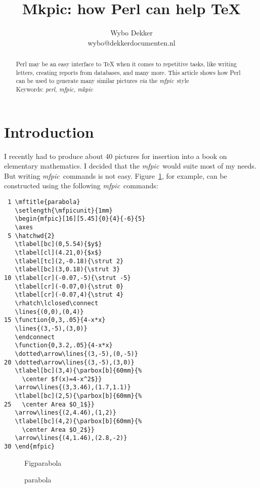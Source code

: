\documentclass[a4paper,twocolumn]{article}
\def\Mfpic{\textsl{mfpic}}
\newcommand{\makefigure}[1]{
  \vspace{2ex}
  \begin{figure}[htb]
    \begin{center}
      \mbox{\quad\csname Fig#1\endcsname}
      \caption{#1}
      \label{fig:#1}
    \end{center}
  \end{figure}
}
\begin{document}
\title{Mkpic: how Perl can help \TeX}

\author{Wybo Dekker\\wybo@dekkerdocumenten.nl}
\maketitle
\begin{abstract}
  Perl may be an easy interface to \TeX{} when it comes to repetitive
  tasks, like writing letters, creating reports from databases, and
  many more. This article shows how Perl can be used to generate many
  similar pictures \emph{via} the \Mfpic\ style
  \\[2ex]
  \noindent Keywords: \textit{perl, mfpic, mkpic}
\end{abstract}

\section{Introduction}
I recently had to produce about 40 pictures for insertion into 
a book on elementary mathematics.  I decided that the \Mfpic\ would
suite most of my needs. But writing \Mfpic\ commands is not easy.
Figure~\ref{fig:parabola}, for example, can be constructed using the
following \Mfpic\ commands:

\footnotesize
\begin{verbatim}
 1 \mftitle{parabola}
   \setlength{\mfpicunit}{1mm}
   \begin{mfpic}[16][5.45]{0}{4}{-6}{5}
   \axes
 5 \hatchwd{2}
   \tlabel[bc](0,5.54){$y$}
   \tlabel[cl](4.21,0){$x$}
   \tlabel[tc](2,-0.18){\strut 2}
   \tlabel[bc](3,0.18){\strut 3}
10 \tlabel[cr](-0.07,-5){\strut -5}
   \tlabel[cr](-0.07,0){\strut 0}
   \tlabel[cr](-0.07,4){\strut 4}
   \rhatch\lclosed\connect
   \lines{(0,0),(0,4)}
15 \function{0,3,.05}{4-x*x}
   \lines{(3,-5),(3,0)}
   \endconnect
   \function{0,3.2,.05}{4-x*x}
   \dotted\arrow\lines{(3,-5),(0,-5)}
20 \dotted\arrow\lines{(3,-5),(3,0)}
   \tlabel[bc](3,4){\parbox[b]{60mm}{%
     \center $f(x)=4-x^2$}}
   \arrow\lines{(3,3.46),(1.7,1.1)}
   \tlabel[bc](2,5){\parbox[b]{60mm}{%
25   \center Area $O_1$}}
   \arrow\lines{(2,4.46),(1,2)}
   \tlabel[bc](4,2){\parbox[b]{60mm}{%
     \center Area $O_2$}}
   \arrow\lines{(4,1.46),(2.8,-2)}
30 \end{mfpic}
\end{verbatim}
\normalsize

\makefigure{parabola}
\end{document}

